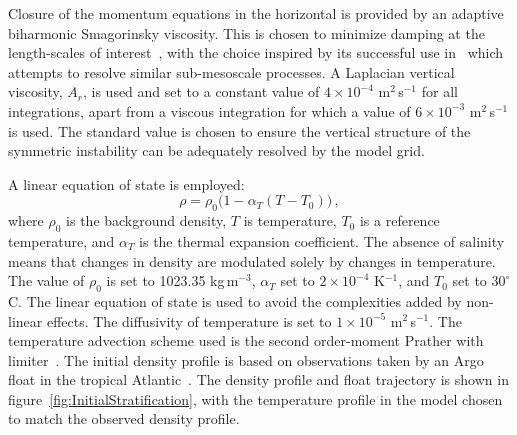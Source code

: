 Closure of the momentum equations in the horizontal is provided by an adaptive biharmonic Smagorinsky viscosity. This is chosen to minimize damping at the  length-scales of interest~\citep{Smagorinsky1963, Griffies2000}, with the choice inspired by its successful use in~\citet{Brannigan2016} which attempts to resolve similar sub-mesoscale processes. A Laplacian vertical viscosity, $A_r$, is used and set to a constant value of $4 \times 10^{-4}$ m$^2$\,s$^{-1}$ for all integrations, apart from a viscous integration for which a value of $6 \times 10^{-3}$ m$^2$\,s$^{-1}$ is used. The standard value is chosen to ensure the vertical structure of the symmetric instability can be adequately resolved by the model grid.

A linear equation of state is employed:
\begin{equation}
    \rho = \rho_{0} \big(1 - \alpha_T (T - T_0 )\big) \, ,
    \label{eq:EOS}
\end{equation}
where $\rho_{0}$ is the background density, $T$ is temperature, $T_0$ is a reference temperature, and $\alpha_T$ is the thermal expansion coefficient. The absence of salinity means that changes in density are modulated solely by changes in temperature. The value of $\rho_{0}$ is set to 1023.35 kg$\,$m$^{-3}$, $\alpha_T$  set to $2 \times 10^{-4}$ K$^{-1}$, and $T_0$ set to $30^{\circ}$C. The linear equation of state is used to avoid the complexities added by non-linear effects. The diffusivity of temperature is set to $1 \times 10^{-5}$ m$^2$\,s$^{-1}$. The temperature advection scheme used is the second order-moment Prather with limiter~\citep{Prather1986}. The initial density profile is based on observations taken by an Argo float in the tropical Atlantic~\citep{Argo2019}. The density profile and float trajectory is shown in figure~\ref{fig:InitialStratification}, with the temperature profile in the model chosen to match the observed density profile.

